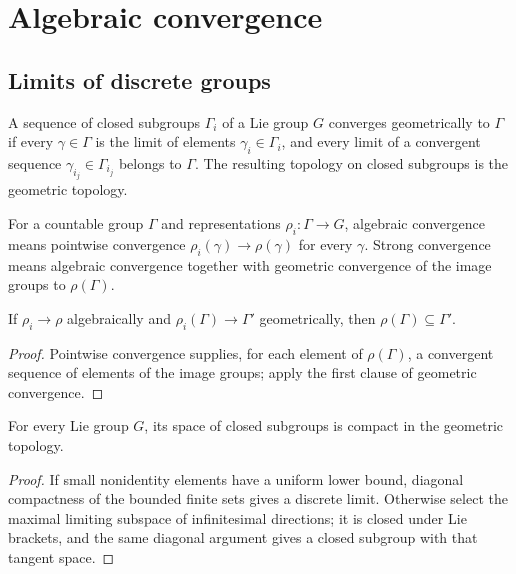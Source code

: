 \chapter{Algebraic convergence}

\section{Limits of discrete groups}

\begin{definition}
\label{thurston-ch09-geometric-convergence}
 A sequence of closed subgroups $\Gamma_i$ of a Lie group $G$ converges geometrically to $\Gamma$ if every $\gamma\in\Gamma$ is the limit of elements $\gamma_i\in\Gamma_i$, and every limit of a convergent sequence $\gamma_{i_j}\in\Gamma_{i_j}$ belongs to $\Gamma$. The resulting topology on closed subgroups is the geometric topology.
\end{definition}

\begin{definition}
\label{thurston-ch09-algebraic-strong-convergence}
 For a countable group $\Gamma$ and representations $\rho_i:\Gamma\to G$, algebraic convergence means pointwise convergence $\rho_i(\gamma)\to\rho(\gamma)$ for every $\gamma$. Strong convergence means algebraic convergence together with geometric convergence of the image groups to $\rho(\Gamma)$.
\end{definition}

\begin{proposition}
\label{thurston-ch09-algebraic-in-geometric}
 If $\rho_i\to\rho$ algebraically and $\rho_i(\Gamma)\to\Gamma'$ geometrically, then $\rho(\Gamma)\subseteq\Gamma'$.
\end{proposition}
\begin{proof}\sketch Pointwise convergence supplies, for each element of $\rho(\Gamma)$, a convergent sequence of elements of the image groups; apply the first clause of geometric convergence.\end{proof}

\begin{proposition}
\label{thurston-ch09-closed-subgroup-compactness}
 For every Lie group $G$, its space of closed subgroups is compact in the geometric topology.
\end{proposition}
\begin{proof}\sketch If small nonidentity elements have a uniform lower bound, diagonal compactness of the bounded finite sets gives a discrete limit. Otherwise select the maximal limiting subspace of infinitesimal directions; it is closed under Lie brackets, and the same diagonal argument gives a closed subgroup with that tangent space.\end{proof}

